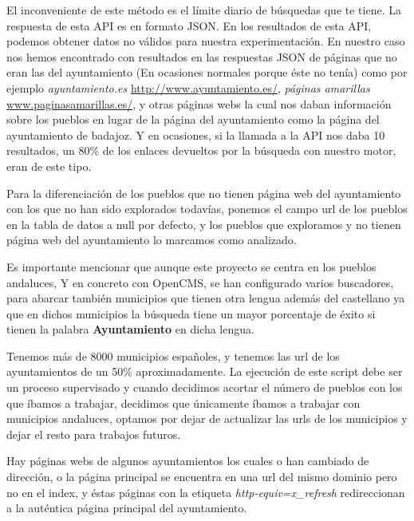 El inconveniente de este método es el límite diario de búsquedas que te tiene. La respuesta de esta API es en formato JSON. En los resultados de esta API, podemos obtener datos no válidos para nuestra experimentación. En nuestro caso nos hemos encontrado con resultados en las respuestas JSON de páginas que no eran las del ayuntamiento (En ocasiones normales porque éste no tenía) como por ejemplo \textit{ayuntamiento.es} \href{http://www.ayuntamiento.es/}{http://www.ayuntamiento.es/}, \textit{páginas amarillas} \href{www.paginasamarillas.es/}{www.paginasamarillas.es/}, y otras páginas webs la cual nos daban información sobre los pueblos en lugar de la página del ayuntamiento como la página del ayuntamiento de badajoz. Y en ocasiones, si la llamada a la API nos daba 10 resultados, un 80\% de los enlaces devueltos por la búsqueda con nuestro motor, eran de este tipo.

Para la diferenciación de los pueblos que no tienen página web del ayuntamiento con los que no han sido explorados todavías, ponemos el campo url de los pueblos en la tabla de datos a null por defecto, y los pueblos que exploramos y no tienen página web del ayuntamiento lo marcamos como analizado.


Es importante mencionar que aunque este proyecto se centra en los pueblos andaluces, Y en concreto con OpenCMS, se han configurado varios buscadores, para abarcar también municipios que tienen otra lengua además del castellano ya que en dichos municipios la búsqueda tiene un mayor porcentaje de éxito si tienen la palabra \textbf{Ayuntamiento} en dicha lengua.

Tenemos más de 8000 municipios españoles, y tenemos las url de los ayuntamientos de un 50\% aproximadamente. La ejecución de este script debe ser un proceso supervisado y cuando decidimos acortar el número de pueblos con los que íbamos a trabajar, decidimos que únicamente íbamos a trabajar con municipios andaluces, optamos por dejar de actualizar las urls de los municipios y dejar el resto para trabajos futuros. 

Hay páginas webs de algunos ayuntamientos los cuales o han cambiado de dirección, o la página principal se encuentra en una url del mismo dominio pero no en el index, y éstas páginas con la etiqueta \textit{http-equiv=x\_refresh} 
redireccionan a la auténtica página principal del ayuntamiento.


